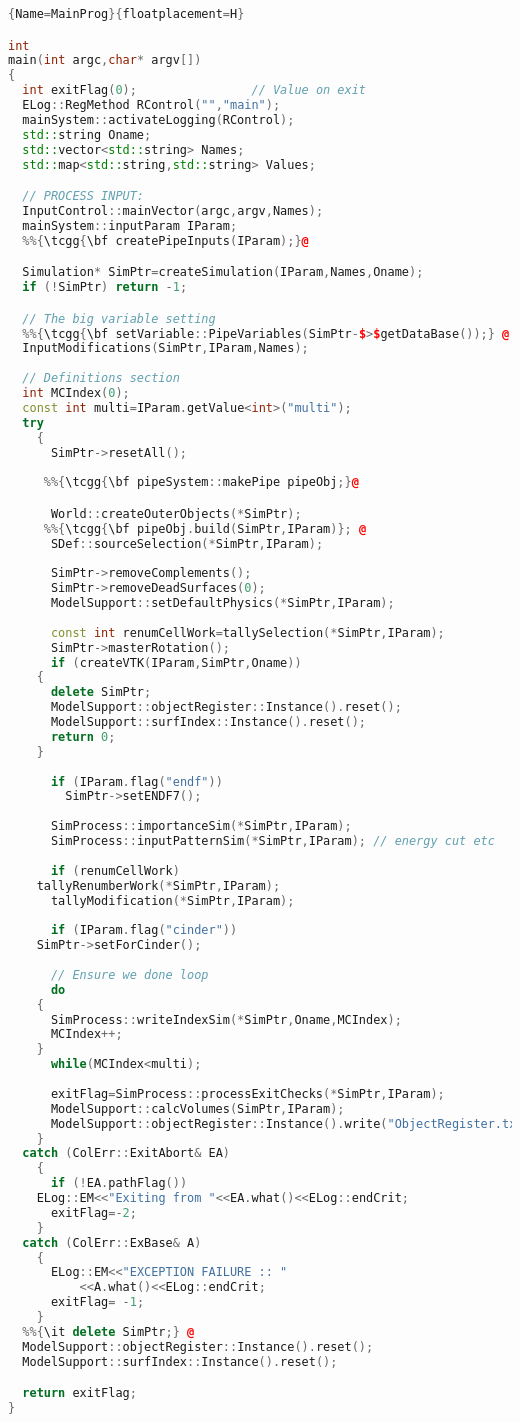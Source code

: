 \begin{lstlisting}[language=C++]{Name=MainProg}{floatplacement=H}

int 
main(int argc,char* argv[])
{
  int exitFlag(0);                // Value on exit
  ELog::RegMethod RControl("","main");
  mainSystem::activateLogging(RControl);
  std::string Oname;
  std::vector<std::string> Names;  
  std::map<std::string,std::string> Values;  

  // PROCESS INPUT:
  InputControl::mainVector(argc,argv,Names);
  mainSystem::inputParam IParam;
  %%{\tcgg{\bf createPipeInputs(IParam);}@

  Simulation* SimPtr=createSimulation(IParam,Names,Oname);
  if (!SimPtr) return -1;

  // The big variable setting
  %%{\tcgg{\bf setVariable::PipeVariables(SimPtr-$>$getDataBase());} @
  InputModifications(SimPtr,IParam,Names);
  
  // Definitions section 
  int MCIndex(0);
  const int multi=IParam.getValue<int>("multi");
  try
    {
      SimPtr->resetAll();
      
     %%{\tcgg{\bf pipeSystem::makePipe pipeObj;}@

      World::createOuterObjects(*SimPtr);
     %%{\tcgg{\bf pipeObj.build(SimPtr,IParam)}; @  
      SDef::sourceSelection(*SimPtr,IParam);
      
      SimPtr->removeComplements();
      SimPtr->removeDeadSurfaces(0);         
      ModelSupport::setDefaultPhysics(*SimPtr,IParam);
      
      const int renumCellWork=tallySelection(*SimPtr,IParam);
      SimPtr->masterRotation();
      if (createVTK(IParam,SimPtr,Oname))
	{
	  delete SimPtr;
	  ModelSupport::objectRegister::Instance().reset();
	  ModelSupport::surfIndex::Instance().reset();
	  return 0;
	}
      
      if (IParam.flag("endf"))
        SimPtr->setENDF7();
      
      SimProcess::importanceSim(*SimPtr,IParam);
      SimProcess::inputPatternSim(*SimPtr,IParam); // energy cut etc
      
      if (renumCellWork)
	tallyRenumberWork(*SimPtr,IParam);
      tallyModification(*SimPtr,IParam);
      
      if (IParam.flag("cinder"))
	SimPtr->setForCinder();
            
      // Ensure we done loop
      do
	{
	  SimProcess::writeIndexSim(*SimPtr,Oname,MCIndex);
	  MCIndex++;
	}
      while(MCIndex<multi);
      
      exitFlag=SimProcess::processExitChecks(*SimPtr,IParam);
      ModelSupport::calcVolumes(SimPtr,IParam);
      ModelSupport::objectRegister::Instance().write("ObjectRegister.txt");
    }
  catch (ColErr::ExitAbort& EA)
    {
      if (!EA.pathFlag())
	ELog::EM<<"Exiting from "<<EA.what()<<ELog::endCrit;
      exitFlag=-2;
    }
  catch (ColErr::ExBase& A)
    {
      ELog::EM<<"EXCEPTION FAILURE :: "
	      <<A.what()<<ELog::endCrit;
      exitFlag= -1;
    }
  %%{\it delete SimPtr;} @
  ModelSupport::objectRegister::Instance().reset();
  ModelSupport::surfIndex::Instance().reset();

  return exitFlag;
}
\end{lstlisting}

